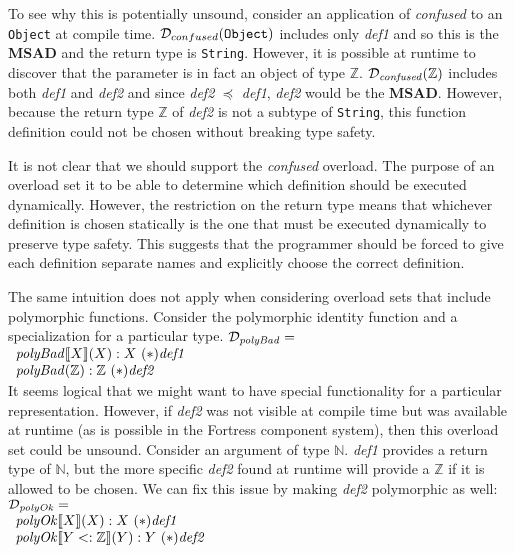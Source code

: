 \documentclass[preprint]{sigplanconf}
\newcommand{\ob}[1]{\ensuremath{\llbracket {#1} \rrbracket}}
\newcommand{\ms}{\preceq}
\begin{document}
To see why this is potentially unsound, consider an application of {\it confused} to an {\tt Object} at
compile time.  $\mathcal{D}_{confused}({\tt Object})$ includes only {\it def1} and so this is the {\bf MSAD}
and the return type is {\tt String}.  However, it is possible at runtime to discover that the parameter is
in fact an object of type $\mathbb{Z}$.  $\mathcal{D}_{{\it confused}}(\mathbb{Z})$ includes both 
{\it def1} and {\it def2} and since {\it def2} $\ms$ {\it def1}, {\it def2} would be the {\bf MSAD}.  However,
because the return type $\mathbb{Z}$ of {\it def2} is not a subtype of {\tt String}, this function definition
could not be chosen without breaking type safety.  

It is not clear that we should support the {\it confused} overload.  The purpose of an overload set it
to be able to determine which definition should be executed dynamically.  However, the restriction
on the return type means that whichever definition is chosen statically is the one that must be executed
dynamically to preserve type safety.  This suggests that the programmer should be forced to give each
definition separate names and explicitly choose the correct definition.

The same intuition does not apply when considering overload sets that include polymorphic functions.
Consider the polymorphic identity function and a specialization for a particular type.  $\mathcal{D}_{{\it polyBad}}=$\\

$\begin{array}{l}
{\it polyBad}\ob{X}(X) : X~(*){\it def1}\\
{\it polyBad}(\mathbb{Z}) : \mathbb{Z}~(*){\it def2}\\
\end{array}$\\

It seems logical that we might want to have special functionality for a particular representation.  However,
if {\it def2} was not visible at compile time but was available at runtime (as is possible in the Fortress component 
system), then this overload set could be unsound.  Consider an argument of type $\mathbb{N}$.  {\it def1}
provides a return type of $\mathbb{N}$, but the more specific {\it def2} found at runtime will provide a $\mathbb{Z}$
if it is allowed to be chosen.  We can fix this issue by making {\it def2} polymorphic as well: $\mathcal{D}_{{\it polyOk}}=$\\

$\begin{array}{l}
{\it polyOk}\ob{X}(X) : X~(*){\it def1}\\
{\it polyOk}\ob{Y <: \mathbb{Z}}(Y) : Y~(*){\it def2}\\
\end{array}$\\
\end{document}

